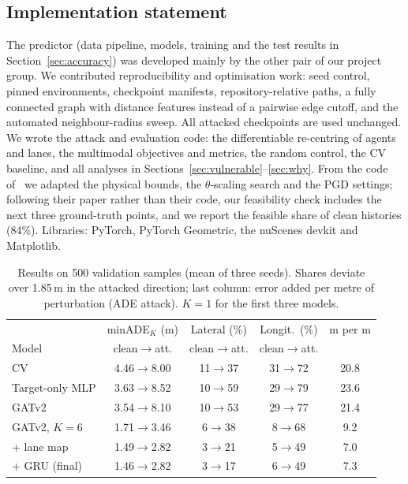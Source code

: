 \documentclass[conference]{IEEEtran}
\begin{document}
\subsection{Implementation statement}\label{sec:impl}
The predictor (data pipeline, models, training and the test results in Section~\ref{sec:accuracy}) was developed mainly by the other pair of our project group. We contributed reproducibility and optimisation work: seed control, pinned environments, checkpoint manifests, repository-relative paths, a fully connected graph with distance features instead of a pairwise edge cutoff, and the automated neighbour-radius sweep. All attacked checkpoints are used unchanged. We wrote the attack and evaluation code: the differentiable re-centring of agents and lanes, the multimodal objectives and metrics, the random control, the CV baseline, and all analyses in Sections~\ref{sec:vulnerable}--\ref{sec:why}. From the code of~\cite{zhang2022adversarial} we adapted the physical bounds, the $\theta$-scaling search and the PGD settings; following their paper rather than their code, our feasibility check includes the next three ground-truth points, and we report the feasible share of clean histories (84\%). Libraries: PyTorch, PyTorch Geometric, the nuScenes devkit and Matplotlib.

\begin{table}[t]
\centering
\caption{Results on 500 validation samples (mean of three seeds). Shares deviate over 1.85\,m in the attacked direction; last column: error added per metre of perturbation (ADE attack). $K{=}1$ for the first three models.}
\label{tab:ladder}
\footnotesize
\setlength{\tabcolsep}{3pt}
\begin{tabular}{@{}lcccc@{}}
\toprule
& minADE$_K$ (m) & Lateral (\%) & Longit.\ (\%) & m per m \\
Model & clean$\to$att. & clean$\to$att. & clean$\to$att. & \\
\midrule
CV & 4.46$\to$8.00 & 11$\to$37 & 31$\to$72 & 20.8 \\
Target-only MLP & 3.63$\to$8.52 & 10$\to$59 & 29$\to$79 & 23.6 \\
GATv2 & 3.54$\to$8.10 & 10$\to$53 & 29$\to$77 & 21.4 \\
GATv2, $K{=}6$ & 1.71$\to$3.46 & \phantom{0}6$\to$38 & \phantom{0}8$\to$68 & \phantom{0}9.2 \\
\quad + lane map & 1.49$\to$2.82 & \phantom{0}3$\to$21 & \phantom{0}5$\to$49 & \phantom{0}7.0 \\
\quad + GRU (final) & 1.46$\to$2.82 & \phantom{0}3$\to$17 & \phantom{0}6$\to$49 & \phantom{0}7.3 \\
\bottomrule
\end{tabular}
\end{table}
\end{document}
